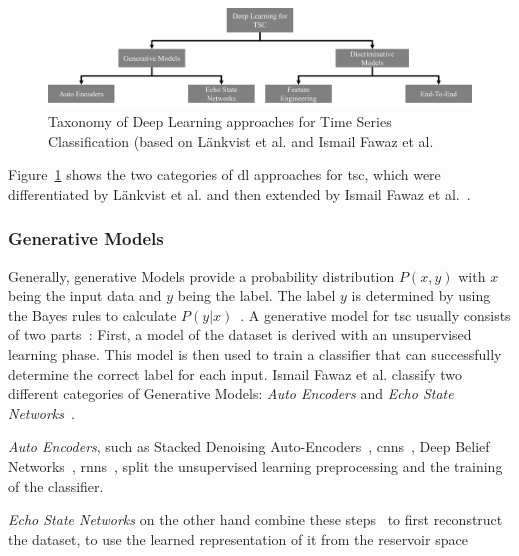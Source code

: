 \begin{figure}
    \center
    \includegraphics[width=\columnwidth]{fig/deep_learning_approaches.pdf}
    \caption{Taxonomy of Deep Learning approaches for Time Series Classification (based on L\"ankvist et al. and Ismail Fawaz et al.~\cite{langkvist2014review,ismail2019deep}}
    \label{fig:deep_learning_approaches}
\end{figure}

Figure~\ref{fig:deep_learning_approaches} shows the two categories of \ac{dl} approaches for \ac{tsc}, which were differentiated by L\"ankvist et al. and then extended by Ismail Fawaz et al.~\cite{langkvist2014review,ismail2019deep}.

\subsubsection*{Generative Models}
Generally, generative Models provide a probability distribution $P(x,y)$ with $x$ being the input data and $y$ being the label.
The label $y$ is determined by using the Bayes rules to calculate $P(y|x)$~\cite{ng2001discriminative}.
A generative model for \ac{tsc} usually consists of two parts~\cite{langkvist2014review}: First, a model of the dataset is derived with an unsupervised learning phase.
This model is then used to train a classifier that can successfully determine the correct label for each input.
Ismail Fawaz et al. classify two different categories of Generative Models: \textit{Auto Encoders} and \textit{Echo State Networks}~\cite{ismail2019deep}.

\textit{Auto Encoders}, such as Stacked Denoising Auto-Encoders~\cite{bengio2013generalized}, \acp{cnn}~\cite{song2020representation}, Deep Belief Networks~\cite{banerjee2019deep}, \acp{rnn}~\cite{rajan2018generative}, split the unsupervised learning preprocessing
and the training of the classifier.

\textit{Echo State Networks} on the other hand combine these steps~\cite{jaeger2001echo} to first reconstruct the dataset, to use the learned representation of it from the reservoir space~\cite{aswolinskiy2018time,bianchi2020reservoir,chouikhi2018genesis,ma2016functional}

